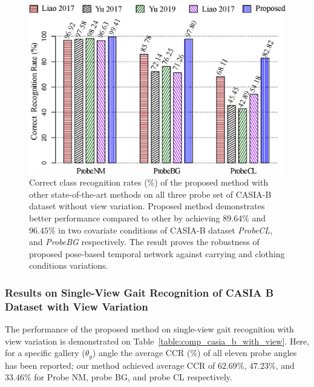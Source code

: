 \begin{figure}
	\centering
	\includegraphics[width = 115mm]{figures/comp_casia_b_without_view.eps}
	\caption{
		Correct class recognition rates (\%) of the proposed method with other state-of-the-art methods on all three probe set of CASIA-B dataset without view variation. Proposed method demonstrates better performance compared to other by achieving $89.64\%$ and $96.45\%$ in two covariate conditions of CASIA-B dataset \textit{ProbeCL}, and \textit{ProbeBG} respectively. The result proves the robustness of proposed pose-based temporal network against carrying and clothing conditions variations. 
	}
	\label{fig:comp_casia_b_without_view}
\end{figure}


\subsubsection{Results on Single-View Gait Recognition of CASIA B Dataset with View Variation}
The performance of the proposed method on single-view gait recognition with view variation is demonstrated on Table~\ref{table:comp_casia_b_with_view}. Here, for a specific gallery ($ \theta_g $) angle the average CCR (\%) of all eleven probe angles has been reported; our method achieved average CCR of $62.69\%$, $47.23\%$, and $33.46\%$ for Probe NM, probe BG, and probe CL respectively.


